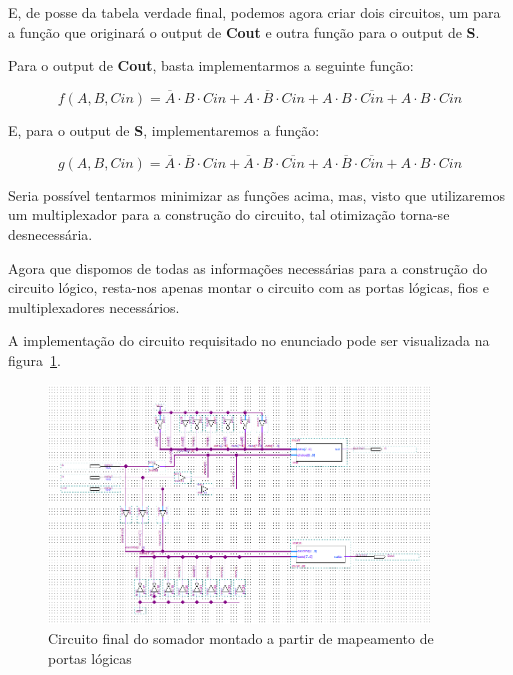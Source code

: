 \documentclass[12pt]{article}
\begin{document}
E, de posse da tabela verdade final, podemos agora criar dois circuitos, um para
a função que originará o output de \textbf{Cout} e outra função para o output de
\textbf{S}.

Para o output de \textbf{Cout}, basta implementarmos a seguinte função:

\begin{equation}
f(A,B,Cin) = \overline{A} \cdot B \cdot Cin + A \cdot \overline{B} \cdot Cin + A \cdot B \cdot \overline{Cin} + A \cdot B \cdot Cin
\end{equation}

E, para o output de \textbf{S}, implementaremos a função:

\begin{equation}
g(A,B,Cin) = \overline{A} \cdot \overline{B} \cdot Cin + \overline{A} \cdot B \cdot \overline{Cin} + A \cdot \overline{B} \cdot \overline{Cin} + A \cdot B \cdot Cin
\end{equation}

Seria possível tentarmos minimizar as funções acima, mas, visto que utilizaremos
um multiplexador para a construção do circuito, tal otimização torna-se
desnecessária.

Agora que dispomos de todas as informações necessárias para a construção do
circuito lógico, resta-nos apenas montar o circuito com as portas lógicas, fios
e multiplexadores necessários.

A implementação do circuito requisitado no enunciado pode ser visualizada na
figura~\ref{fig:2_1_Circuit.png}.

\begin{figure}[H]
  \centering
  \includegraphics[width=0.9\textwidth]{Exp06/Images/2_1_Circuit.png}
  \caption{Circuito final do somador montado a partir de mapeamento de portas
    lógicas}\label{fig:2_1_Circuit.png}
\end{figure}
\end{document}
